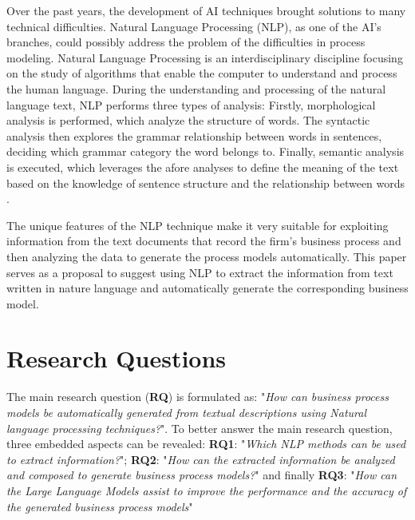 	Over the past years, the development of AI techniques brought solutions to many technical difficulties. Natural Language Processing (NLP), as one of the AI's branches, could possibly address the problem of the difficulties in process modeling. Natural Language Processing is an interdisciplinary discipline focusing on the study of algorithms that enable the computer to understand and process the human language\cite{t2m_3}. During the understanding and processing of the natural language text, NLP performs three types of analysis: Firstly, morphological analysis is performed, which analyze the structure of words. The syntactic analysis then explores the grammar relationship between words in sentences, deciding which grammar category the word belongs to. Finally, semantic analysis is executed, which leverages the afore analyses to define the meaning of the text based on the knowledge of sentence structure and the relationship between words \cite{literature_review_2}. 
	
	The unique features of the NLP technique make it very suitable for exploiting information from the text documents that record the firm's business process and then analyzing the data to generate the process models automatically. This paper serves as a proposal to suggest using NLP to extract the information from text written in nature language and automatically generate the corresponding business model.

\section{Research Questions}
\label{sec:intro:rq}

%


	The main research question (\textbf{RQ}) is formulated as: "\textit{How can business process models be automatically generated from textual descriptions using Natural language processing techniques?}". To better answer the main research question, three embedded aspects can be revealed: \textbf{RQ1}: "\textit{Which NLP methods can be used to extract information?}"; \textbf{RQ2}: "\textit{How can the extracted information be analyzed and composed to generate business process models?}" and finally \textbf{RQ3}: "\textit{How can the Large Language Models assist to improve the performance and the accuracy of the generated business process models}"

